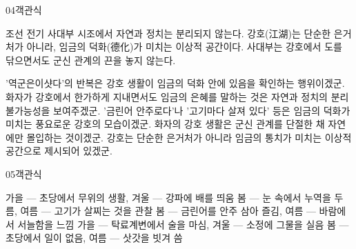 \documentclass[fs85,seriesWit]{korfarm-base}
\begin{document}
\begin{kfQBlock}{04}{객관식}
\begin{kfEvidence}조선 전기 사대부 시조에서 자연과 정치는 분리되지 않는다. 강호(江湖)는 단순한 은거처가 아니라, 임금의 덕화(德化)가 미치는 이상적 공간이다. 사대부는 강호에서 도를 닦으면서도 군신 관계의 끈을 놓지 않는다.\end{kfEvidence}
\begin{kfChoices}
\kfChoice '역군은이샷다'의 반복은 강호 생활이 임금의 덕화 안에 있음을 확인하는 행위이겠군.
\kfChoice 화자가 강호에서 한가하게 지내면서도 임금의 은혜를 말하는 것은 자연과 정치의 분리 불가능성을 보여주겠군.
\kfChoice '금린어 안주로다'나 '고기마다 살져 있다' 등은 임금의 덕화가 미치는 풍요로운 강호의 모습이겠군.
\kfChoice 화자의 강호 생활은 군신 관계를 단절한 채 자연에만 몰입하는 것이겠군.
\kfChoice 강호는 단순한 은거처가 아니라 임금의 통치가 미치는 이상적 공간으로 제시되어 있겠군.
\end{kfChoices}
\end{kfQBlock}

\begin{kfQBlock}{05}{객관식}
\begin{kfChoices}
\kfChoice 가을 — 초당에서 무위의 생활, 겨울 — 강파에 배를 띄움
\kfChoice 봄 — 눈 속에서 누역을 두름, 여름 — 고기가 살찌는 것을 관찰
\kfChoice 봄 — 금린어를 안주 삼아 즐김, 여름 — 바람에서 서늘함을 느낌
\kfChoice 가을 — 탁료계변에서 술을 마심, 겨울 — 소정에 그물을 실음
\kfChoice 봄 — 초당에서 일이 없음, 여름 — 삿갓을 빗겨 씀
\end{kfChoices}
\end{kfQBlock}

\kfEndMC
\end{document}
